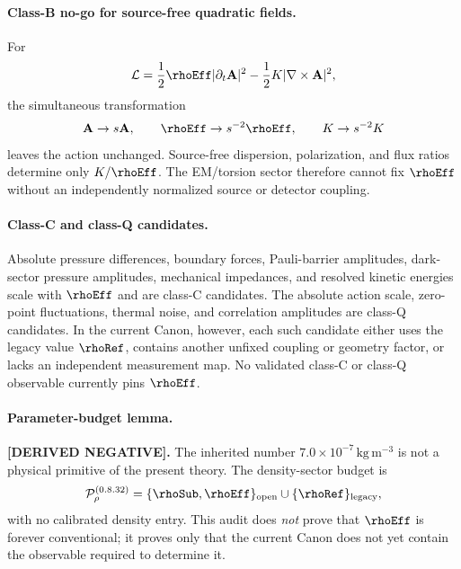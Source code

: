 \paragraph{Class-B no-go for source-free quadratic fields.}
For
\begin{align}
    \mathcal L
    =
    \frac12\rhoEff|\partial_t\mathbf A|^2
    -
    \frac12K|\nabla\times\mathbf A|^2,
\end{align}
the simultaneous transformation
\begin{align}
    \mathbf A\to s\mathbf A,
    \qquad
    \rhoEff\to s^{-2}\rhoEff,
    \qquad
    K\to s^{-2}K
\end{align}
leaves the action unchanged.  Source-free dispersion, polarization, and
flux ratios determine only \(K/\rhoEff\).  The EM/torsion sector therefore
cannot fix \(\rhoEff\) without an independently normalized source or
detector coupling.

\paragraph{Class-C and class-Q candidates.}
Absolute pressure differences, boundary forces, Pauli-barrier amplitudes,
dark-sector pressure amplitudes, mechanical impedances, and resolved
kinetic energies scale with \(\rhoEff\) and are class-C candidates.  The
absolute action scale, zero-point fluctuations, thermal noise, and
correlation amplitudes are class-Q candidates.  In the current Canon,
however, each such candidate either uses the legacy value \(\rhoRef\),
contains another unfixed coupling or geometry factor, or lacks an
independent measurement map.  No validated class-C or class-Q observable
currently pins \(\rhoEff\).

\paragraph{Parameter-budget lemma.}
\textbf{[DERIVED NEGATIVE].}
The inherited number \(7.0\times10^{-7}\,\mathrm{kg\,m^{-3}}\) is not a
physical primitive of the present theory.  The density-sector budget is
\begin{align}
    \mathcal P_{\rho}^{(0.8.32)}
    =
    \{\rhoSub,\rhoEff\}_{\rm open}
    \cup
    \{\rhoRef\}_{\rm legacy},
\end{align}
with no calibrated density entry.  This audit does \emph{not} prove that
\(\rhoEff\) is forever conventional; it proves only that the current Canon
does not yet contain the observable required to determine it.

